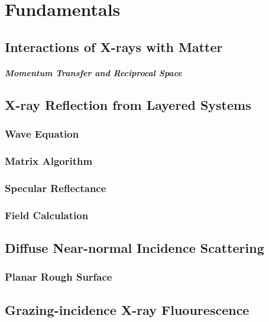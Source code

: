 \chapter{Fundamentals}

\section{Interactions of X-rays with Matter}
\paragraph{Momentum Transfer and Reciprocal Space}

\section{X-ray Reflection from Layered Systems}
\subsection{Wave Equation}
\subsection{Matrix Algorithm}
\subsection{Specular Reflectance}
\subsection{Field Calculation}

\section{Diffuse Near-normal Incidence Scattering}

\subsection{Planar Rough Surface}

\section{Grazing-incidence X-ray Fluourescence}
